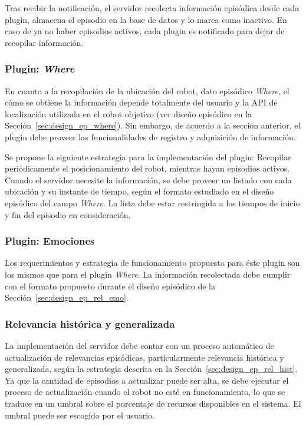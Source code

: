 Tras recibir la notificación, el servidor recolecta información episódica desde cada plugin, almacena el episodio en la base de datos y lo marca como inactivo. En caso de ya no haber episodios activos, cada plugin es notificado para dejar de recopilar información.


\subsubsection{Plugin: \textit{Where}}

En cuanto a la recopilación de la ubicación del robot, dato episódico \textit{Where}, el cómo se obtiene la información depende totalmente del usuario y la API de localización utilizada en el robot objetivo (ver diseño episódico en la Sección~\ref{sec:design_ep_where}). Sin embargo, de acuerdo a la sección anterior, el plugin debe proveer las funcionalidades de registro y adquisición de información.

Se propone la siguiente estrategia para la implementación del plugin: Recopilar periódicamente el posicionamiento del robot, mientras hayan episodios activos. Cuando el servidor necesite la información, se debe proveer un listado con cada ubicación y su instante de tiempo, según el formato estudiado en el diseño episódico del campo \textit{Where}. La lista debe estar restringida a los tiempos de inicio y fin del episodio en consideración.


\subsubsection{Plugin: Emociones}

Los requerimientos y estrategia de funcionamiento propuesta para éste plugin son los mismos que para el plugin \textit{Where}. La información recolectada debe cumplir con el formato propuesto durante el diseño episódico de la Sección~\ref{sec:design_ep_rel_emo}.


\subsubsection{Relevancia histórica y generalizada}

La implementación del servidor debe contar con un proceso automático de actualización de relevancias episódicas, particularmente relevancia histórica y generalizada, según la estrategia descrita en la Sección~\ref{sec:design_ep_rel_hist}. Ya que la cantidad de episodios a actualizar puede ser alta, se debe ejecutar el proceso de actualización cuando el robot no esté en funcionamiento, lo que se traduce en un umbral sobre el porcentaje de recursos disponibles en el sistema. El umbral puede ser escogido por el usuario.


